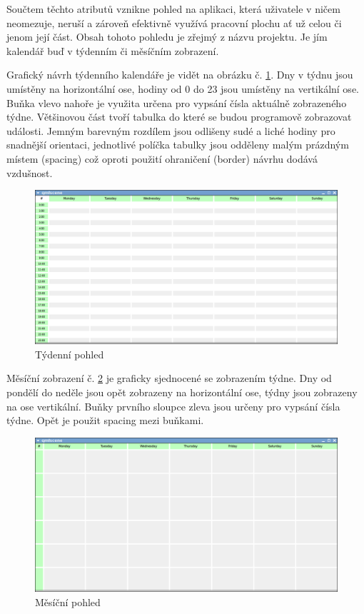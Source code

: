 \documentclass[a4paper, 12pt]{article}[7.12.2013]
\begin{document}
Součtem těchto atributů vznikne pohled na aplikaci, která uživatele v ničem neomezuje, neruší a zároveň efektivně využívá pracovní plochu ať už celou či jenom její část. Obsah tohoto pohledu je zřejmý z názvu projektu. Je jím kalendář buď v týdenním či měsíčním zobrazení.

Grafický návrh týdenního kalendáře je vidět na obrázku č. \ref{fig:week}. Dny v týdnu jsou umístěny na horizontální ose, hodiny od 0 do 23 jsou umístěny na vertikální ose. Buňka vlevo nahoře je využita určena pro vypsání čísla aktuálně zobrazeného týdne. Většinovou část tvoří tabulka do které se budou programově zobrazovat události. Jemným barevným rozdílem jsou odlišeny sudé a liché hodiny pro snadnější orientaci, jednotlivé políčka tabulky jsou odděleny malým prázdným místem (spacing) což oproti použití ohraničení (border) návrhu dodává vzdušnost.
\begin{figure}[h]
    \centering
    \includegraphics[width=\textwidth,height=\textheight,keepaspectratio]{week.png}
    \caption{Týdenní pohled}
    \label{fig:week}
\end{figure}

Měsíční zobrazení č. \ref{fig:month} je graficky sjednocené se zobrazením týdne. Dny od pondělí do neděle jsou opět zobrazeny na horizontální ose, týdny jsou zobrazeny na ose vertikální. Buňky prvního sloupce zleva jsou určeny pro vypsání čísla týdne. Opět je použit spacing mezi buňkami.
\begin{figure}[h]
    \centering
    \includegraphics[width=\textwidth,height=\textheight,keepaspectratio]{month.png}
    \caption{Měsíční pohled}
    \label{fig:month}
\end{figure}
\end{document}
